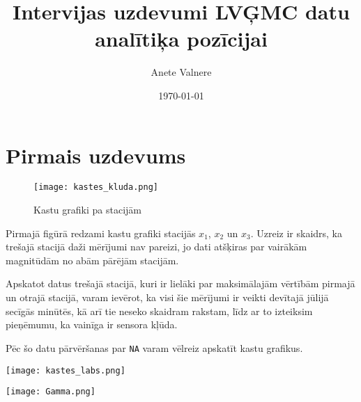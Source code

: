 \documentclass[12pt,a4paper]{article}
\title{Intervijas uzdevumi LVĢMC datu analītiķa pozīcijai}
\author{Anete Valnere}
\date{\today}
\begin{document}
\begingroup
\let\center\flushright
\let\endcenter\endflushright
\maketitle
\endgroup
\section*{Pirmais uzdevums}


\begin{figure}[h]
    \centering
    \texttt{[image: kastes\_kluda.png]}
    \caption{Kastu grafiki pa stacijām}
\end{figure}
Pirmajā figūrā redzami kastu grafiki stacijās \(x_1\), \(x_2\) un \(x_3\). Uzreiz ir skaidrs, ka trešajā stacijā daži mērījumi nav pareizi, jo dati atšķiras par vairākām magnitūdām no abām pārējām stacijām.%


Apskatot datus trešajā stacijā, kuri ir lielāki par maksimālajām vērtībām pirmajā un otrajā stacijā, varam ievērot, ka visi šie mērījumi ir veikti devītajā jūlijā secīgās minūtēs, kā arī tie neseko skaidram rakstam, līdz ar to izteiksim pieņēmumu, ka vainīga ir sensora kļūda.

Pēc šo datu pārvēršanas par \texttt{NA} varam vēlreiz apskatīt kastu grafikus.

\noindent\begin{minipage}[t]{.7\textwidth}
    \centering
    \texttt{[image: kastes\_labs.png]}
\end{minipage}%
\begin{minipage}[t]{.3\textwidth}
    \centering
    \texttt{[image: Gamma.png]}
    \label{gamma}
\end{minipage}
\end{document}

